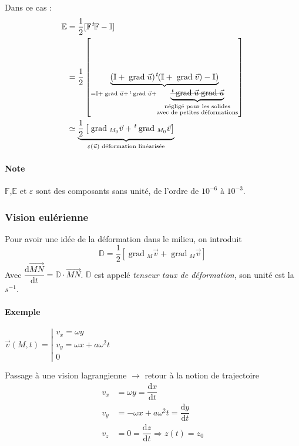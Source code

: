 \documentclass{article}
\newcommand{\deriv}{\mathrm{d}}
\newcommand{\grad}{\;\mathrm{grad}\;}
\newcommand{\transpose}{\hspace{.1em}{}^t\hspace{-.1em}}
\begin{document}
Dans ce cas :
\begin{align*}
\mathbb{E} & = \dfrac{1}{2}[\mathbb{F}\transpose \mathbb{F} - \mathbb{I}]\\
& = \dfrac{1}{2} \left[ \underbrace{(\mathbb{I} + \grad \vec{u})\transpose(\mathbb{I}+\grad \vec{v}) - \mathbb{I})}_{= \mathbb{I}+ \grad \vec{u} + \transpose \grad \vec{u} + \underbrace{\text{\sout{$\transpose \grad \vec{u}\grad \vec{u}$}}}_{\substack{\text{négligé pour les solides}\\\text{avec de petites déformations}}}} \right]\\
& \simeq \underbrace{\dfrac{1}{2} \left[ \grad_{M_0} \vec{v} + \transpose \grad_{M_0} \vec{v} \right]}_{\varepsilon (\vec{u})\text{ déformation linéarisée}}\\
\end{align*}

\paragraph{Note}
$\mathbb{F}$,$\mathbb{E}$ et $\varepsilon$ sont des composants sans unité, de l'ordre de $10^{-6}$ à $10^{-3}$.

\subsubsection{Vision eulérienne}
Pour avoir une idée de la déformation dans le milieu, on introduit
\[\mathbb{D} = \dfrac{1}{2} \left[ \grad_M \vec{v} + \grad_M \vec{v} \right]\]
Avec $\dfrac{\deriv  \overrightarrow{MN}}{\deriv t} = \mathbb{D} \cdot \overrightarrow{MN}$. $\mathbb{D}$ est appelé \emph{tenseur taux de déformation}, son unité est la $s^{-1}$.


\paragraph{Exemple} $\vec{v}(M,t) = \left\lvert \begin{matrix}
v_x = \omega y\\
v_y = \omega x + a\omega^2 t\\
0
\end{matrix}\right.$


Passage à une vision lagrangienne $\to$ retour à la notion de trajectoire
\begin{align*}
v_x & = \omega y = \dfrac{\deriv x}{\deriv t}\\
v_y & = -\omega x + a\omega^2 t = \dfrac{\deriv y}{\deriv	t}\\
v_z & = 0 = \dfrac{\deriv z}{\deriv t} \Rightarrow z(t) = z_0
\end{align*}
\end{document}

